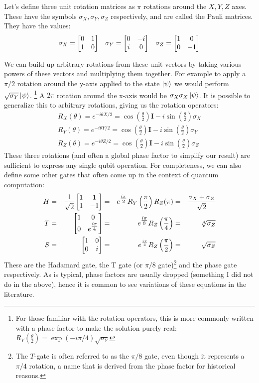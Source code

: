 Let's define three unit rotation matrices as $\pi$ rotations around the $X, Y, Z$ axes. These have the symbols
$\sigma_X, \sigma_Y, \sigma_Z$ respectively, and are called the Pauli matrices.
They have the values:
\begin{align}
  \sigma_X = \begin{bmatrix}0&1\\1&0\end{bmatrix} && \sigma_Y = \begin{bmatrix}0&-i\\i&0\end{bmatrix} && \sigma_Z = \begin{bmatrix}1&0\\0&-1\end{bmatrix}
  \label{eq:pauli}
\end{align}

We can build up arbitrary rotations from these unit vectors by taking various powers of these vectors
and multiplying them together. For example to apply a $\pi/2$ rotation around the y-axis applied to the state $\ket{\psi}$
we would perform $\sqrt{\sigma_Y}\ket{\psi}$. \footnote{For those familiar with the rotation operators,
this is more commonly written with a phase factor to make the solution purely real: $R_Y(\tfrac{\theta}{2})
= \exp(-i\pi/4)\sqrt{\sigma_Y}$}
A $2\pi$ rotation around the x-axis would be $\sigma_X\sigma_X\ket{\psi}$. It is possible to generalize this
to arbitrary rotations, giving us the rotation operators\cite{Nielsen:rot}:
\begin{align}
  R_X(\theta) = e^{-i \theta X/2} = \cos\left(\frac{\theta}{2}\right)\boldsymbol{I} - i \sin\left(\frac{\theta}{2}\right)\sigma_X \\
  R_Y(\theta) = e^{-i \theta Y/2} = \cos\left(\frac{\theta}{2}\right)\boldsymbol{I} - i \sin\left(\frac{\theta}{2}\right)\sigma_Y \\
  R_Z(\theta) = e^{-i \theta Z/2} = \cos\left(\frac{\theta}{2}\right)\boldsymbol{I} - i \sin\left(\frac{\theta}{2}\right)\sigma_Z
\end{align}
These three rotations (and often a global phase factor to simplify our result) are sufficient to express
any single qubit operation. For completeness, we can also define some other gates that often come up in
the context of quantum computation:
\begin{alignat}{4}
    H &=& \frac{1}{\sqrt{2}}\begin{bmatrix}1&1\\1&-1\end{bmatrix} &=& e^{\tfrac{i\pi}{2}} R_Y\left(\frac{\pi}{2}\right) R_Z(\pi) &=& \frac{\sigma_X+\sigma_Z}{\sqrt{2}} \\
    T &=& \begin{bmatrix}1&0\\0&e^{\tfrac{i\pi}{4}}\end{bmatrix}  &=& e^{\tfrac{i\pi}{8}} R_Z\left(\frac{\pi}{4}\right)          &=& \sqrt[4]{\sigma_Z} \\
    S &=& \begin{bmatrix}1&0\\0&i\end{bmatrix}                    &=& e^{\frac{i \pi}{4}} R_Z\left(\frac{\pi}{2}\right)          &=& \sqrt{\sigma_Z}
\end{alignat}
These are the Hadamard gate, the T gate (or $\pi/8$ gate)\footnote{The $T$-gate is often
referred to as the $\pi/8$ gate, even though it represents a $\pi/4$ rotation, a name that is derived from
the phase factor for historical reasons.} and the phase gate respectively.
As is typical, phase factors are usually dropped (something I did not do in the above), hence it is
common to see variations of these equations in the literature.

